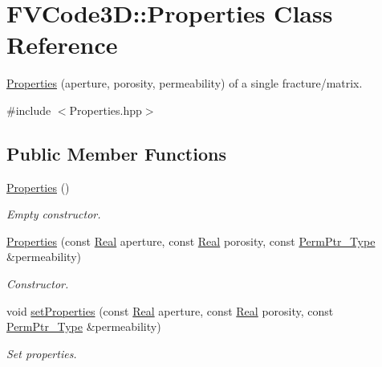 \hypertarget{classFVCode3D_1_1Properties}{}\section{F\+V\+Code3D\+:\+:Properties Class Reference}
\label{classFVCode3D_1_1Properties}


\hyperlink{classFVCode3D_1_1Properties}{Properties} (aperture, porosity, permeability) of a single fracture/matrix.  




{\ttfamily \#include $<$Properties.\+hpp$>$}

\subsection*{Public Member Functions}
\begin{DoxyCompactItemize}
\item 
\hyperlink{classFVCode3D_1_1Properties_a6973ad7404c3bcb871fa9b9d5ea0fdfe}{Properties} ()
\begin{DoxyCompactList}\small\item\em Empty constructor. \end{DoxyCompactList}\item 
\hyperlink{classFVCode3D_1_1Properties_a36e262d7a5f3d3b891fd5b3b2d6ecd42}{Properties} (const \hyperlink{namespaceFVCode3D_a40c1f5588a248569d80aa5f867080e83}{Real} aperture, const \hyperlink{namespaceFVCode3D_a40c1f5588a248569d80aa5f867080e83}{Real} porosity, const \hyperlink{namespaceFVCode3D_aee5ae48a57366603109f90f526a645b1}{Perm\+Ptr\+\_\+\+Type} \&permeability)
\begin{DoxyCompactList}\small\item\em Constructor. \end{DoxyCompactList}\item 
void \hyperlink{classFVCode3D_1_1Properties_a0ddb477254cfacdb96a440ddedc2548c}{set\+Properties} (const \hyperlink{namespaceFVCode3D_a40c1f5588a248569d80aa5f867080e83}{Real} aperture, const \hyperlink{namespaceFVCode3D_a40c1f5588a248569d80aa5f867080e83}{Real} porosity, const \hyperlink{namespaceFVCode3D_aee5ae48a57366603109f90f526a645b1}{Perm\+Ptr\+\_\+\+Type} \&permeability)
\begin{DoxyCompactList}\small\item\em Set properties. \end{DoxyCompactList}\end{DoxyCompactItemize}
